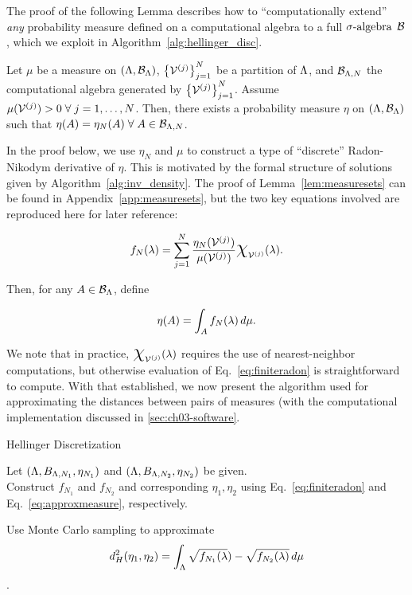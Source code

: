 The proof of the following Lemma describes how to ``computationally extend'' {\em any} probability measure defined on a computational algebra to a full $\sigma\text{-algebra}$ $\mathcal{B}$, which we exploit in Algorithm~\ref{alg:hellinger_disc}.
\begin{lem}
\label{lem:measuresets}
Let $\mu$ be a measure on $({\Lambda}, \mathcal{B}_{\Lambda})$, $\left\{\mathcal{V}^{(j)}\right\}_{j=1}^{N}$ be a partition of ${\Lambda}$, and $\mathcal{B}_{{\Lambda}, N}$ the computational algebra generated by $\left\{\mathcal{V}^{(j)}\right\}_{j=1}^{N}$. 
Assume $\mu (\mathcal{V}^{(j)}) > 0 \; \forall \; j=1,\hdots, N$. 
Then, there exists a probability measure $\eta$ on $({\Lambda}, \mathcal{B}_{\Lambda})$ such that $\eta(A) = \eta_N(A) \; \forall \; A\in\mathcal{B}_{{\Lambda}, N}$. 
\end{lem}
In the proof below, we use $\eta_N$ and $\mu$ to construct a type of ``discrete'' Radon-Nikodym derivative of $\eta$. 
This is motivated by the formal structure of solutions given by Algorithm~\ref{alg:inv_density}.
The proof of Lemma~\ref{lem:measuresets} can be found in Appendix~\ref{app:measuresets}, but the two key equations involved are reproduced here for later reference:

\begin{equation}\label{eq:finiteradon}
f_N (\param) = \sum_{j=1}^{N} \frac{\eta_N (\VV^{(j)}) }{\mu (\VV^{(j)})} \Chi_{\VV^{(j)}} (\param).
\end{equation}

Then, for any $A\in\mathcal{B}_{\Lambda}$, define

\begin{equation}\label{eq:approxmeasure}
\eta (A) = \int_A f_N (\lambda) \, d\mu.
\end{equation}

We note that in practice, $\Chi_{\VV^{(j)}} (\param)$ requires the use of nearest-neighbor computations, but otherwise evaluation of Eq.~\eqref{eq:finiteradon} is straightforward to compute.
With that established, we now present the algorithm used for approximating the distances between pairs of measures (with the computational implementation discussed in \ref{sec:ch03-software}.


\begin{algorithm}
\DontPrintSemicolon
\caption{Hellinger Discretization}
\label{alg:hellinger_disc}
Let $({\Lambda}, B_{{\Lambda}, N_1}, \eta_{N_1} )$ and $({\Lambda}, B_{{\Lambda}, N_2}, \eta_{N_2} )$ be given.\\
 
Construct $f_{N_1}$ and $f_{N_2}$ and corresponding $\eta_1, \eta_2$ using Eq.~\eqref{eq:finiteradon} and Eq.~\eqref{eq:approxmeasure}, respectively.

Use Monte Carlo sampling to approximate
$$ d^2_H(\eta_1, \eta_2) = \int_{\Lambda} \sqrt{f_{N_1}(\lambda}) - \sqrt{f_{N_2}(\lambda)} \, d\mu $$.
\end{algorithm}

